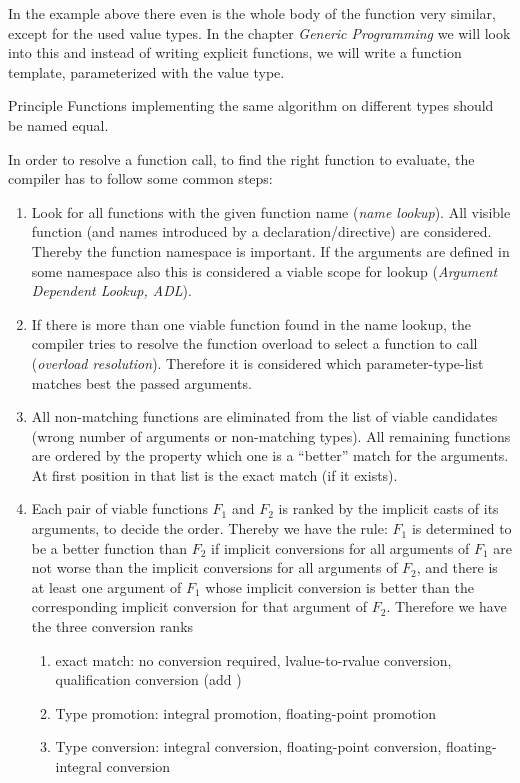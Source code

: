 \begin{rem}
  In the example above there even is the whole body of the function very similar, except for the used value types. In the chapter \emph{Generic Programming}
  we will look into this and instead of writing explicit functions, we will write a function template, parameterized with the value type.
\end{rem}

\begin{guideline}{Principle}
  Functions implementing the same algorithm on different types should be named equal.
\end{guideline}

In order to resolve a function call, \ie to find the right function to evaluate, the compiler has to follow some common steps:
\begin{enumerate}
  \item Look for all functions with the given function name (\emph{name lookup}). All visible function (and names introduced by a 
        declaration/directive) are considered. Thereby the function namespace is important. If the arguments are defined in some namespace also this
        is considered a viable scope for lookup (\emph{Argument Dependent Lookup, ADL}).
  \item If there is more than one viable function found in the name lookup, the compiler tries to resolve the function overload to select a
        function to call (\emph{overload resolution}). Therefore it is considered which parameter-type-list matches best the passed arguments.
  \item All non-matching functions are eliminated from the list of viable candidates (\eg wrong number of arguments or non-matching types). All
        remaining functions are ordered by the property which one is a ``better'' match for the arguments. At first position in that list is the exact
        match (if it exists).
  \item Each pair of viable functions $F_1$ and $F_2$ is ranked by the implicit casts of its arguments, to decide the order. Thereby we have the rule:
        $F_1$ is determined to be a better function than $F_2$ if implicit conversions for all arguments of $F_1$ are not worse than the implicit
        conversions for all arguments of $F_2$, and there is at least one argument of $F_1$ whose implicit conversion is better than the corresponding
        implicit conversion for that argument of $F_2$. Therefore we have the three conversion ranks
        \begin{enumerate}
          \item exact match: no conversion required, lvalue-to-rvalue conversion, qualification conversion (\eg add )
          \item Type promotion: integral promotion, floating-point promotion
          \item Type conversion: integral conversion, floating-point conversion, floating-integral conversion
        \end{enumerate}
\end{enumerate}

